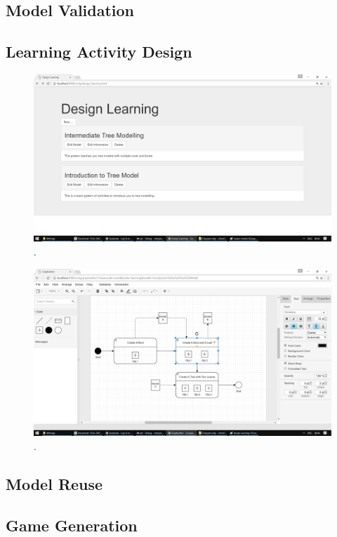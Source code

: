 \documentclass[12pt, a4paper]{report} \usepackage[titletoc]{appendix}
\begin{document}
\begin{appendices}
\subsection{Model Validation}



\subsection{Learning Activity Design}

\begin{figure}[ht] \centering \includegraphics[width=12cm]{design-learning-01}
\caption{.}
\label{design-learning-01}
\end{figure}

\begin{figure}[ht] \centering \includegraphics[width=12cm]{design-learning-02}
\caption{.}
\label{design-learning-02}
\end{figure}


\subsection{Model Reuse}


\subsection{Game Generation}



\end{appendices}
\end{document}
